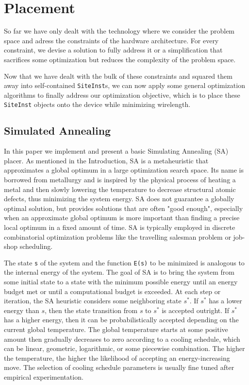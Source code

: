 
\section{Placement}
\label{sec:placement}
So far we have only dealt with the technology where we consider the problem space and adress the constraints of the hardware architecture. 
For every constraint, we devise a solution to fully address it or a simplification that sacrifices some optimization but reduces the complexity of the problem space. 

Now that we have dealt with the bulk of these constraints and squared them away into self-contained \texttt{SiteInst}s, we can now apply some general optimization algorithms to finally address our optimization objective, which is to place these \texttt{SiteInst} objects onto the device while minimizing wirelength. 

\subsection{Simulated Annealing}
\label{subsec:simulated_annealing}

In this paper we implement and present a basic Simulating Annealing (SA) placer. 
As mentioned in the Introduction, SA is a metaheuristic that approximates a global optimum in a large optimization search space. 
Its name is borrowed from metallurgy and is inspired by the physical process of heating a metal and then slowly lowering the temperature to decrease structural atomic defects, thus minimizing the system energy. 
SA does not guarantee a globally optimal solution, but provides solutions that are often "good enough", especially when an approximate global optimum is more important than finding a precise local optimum in a fixed amount of time. 
SA is typically employed in discrete combinatorial optimization problems like the travelling salesman problem or job-shop scheduling. 

The state \texttt{s} of the system and the function \texttt{E(s)} to be minimized is analogous to the internal energy of the system. 
The goal of SA is to bring the system from some initial state to a state with the minimum possible energy until an energy budget met or until a computational budget is exceeded.
At each step or iteration, the SA heuristic considers some neighboring state \(s^*\). 
If \(s^*\) has a lower energy than \(s\), then the state transition from \(s\) to \(s^*\) is accepted outright.
If \(s^*\) has a higher energy, then it can be probabilistically accepted depending on the current global temperature.
The global temperature starts at some positive amount then gradually decreases to zero according to a cooling schedule, which can be linear, geometric, logarithmic, or some piecewise combination. 
The higher the temperature, the higher the likelihood of accepting an energy-increasing move. 
The selection of cooling schedule parameters is usually fine tuned after empirical experimentation. 

